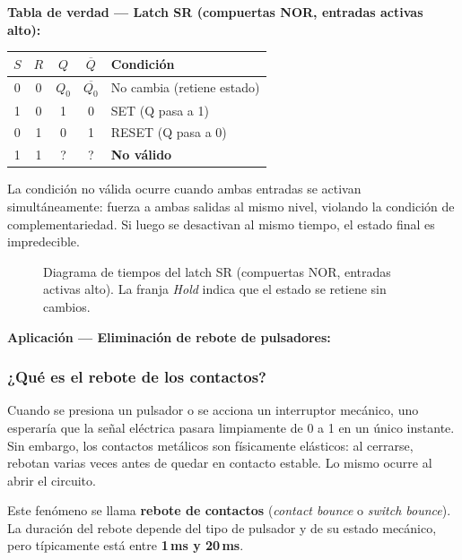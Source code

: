 
\textbf{Tabla de verdad --- Latch SR (compuertas NOR, entradas activas alto):}

\begin{table}[H]
\centering
\begin{tabular}{ccccp{6cm}}
\toprule
$S$ & $R$ & $Q$ & $\overline{Q}$ & Condición \\
\midrule
0 & 0 & $Q_0$ & $\overline{Q_0}$ & No cambia (retiene estado) \\
1 & 0 & 1 & 0 & SET (Q pasa a 1) \\
0 & 1 & 0 & 1 & RESET (Q pasa a 0) \\
1 & 1 & ? & ? & \textbf{No válido} \\
\bottomrule
\end{tabular}
\end{table}

La condición no válida ocurre cuando ambas entradas se activan simultáneamente: fuerza a ambas salidas al mismo nivel, violando la condición de complementariedad. Si luego se desactivan al mismo tiempo, el estado final es impredecible.

\begin{figure}[H]
\centering

\caption{Diagrama de tiempos del latch SR (compuertas NOR, entradas activas alto).
  La franja \textit{Hold} indica que el estado se retiene sin cambios.}
\end{figure}

\textbf{Aplicación --- Eliminación de rebote de pulsadores:}

\subsubsection*{¿Qué es el rebote de los contactos?}

Cuando se presiona un pulsador o se acciona un interruptor mecánico, uno esperaría que la señal eléctrica pasara limpiamente de 0 a 1 en un único instante. Sin embargo, los contactos metálicos son físicamente elásticos: al cerrarse, rebotan varias veces antes de quedar en contacto estable. Lo mismo ocurre al abrir el circuito.

Este fenómeno se llama \textbf{rebote de contactos} (\textit{contact bounce} o \textit{switch bounce}). La duración del rebote depende del tipo de pulsador y de su estado mecánico, pero típicamente está entre \textbf{1\,ms y 20\,ms}.

